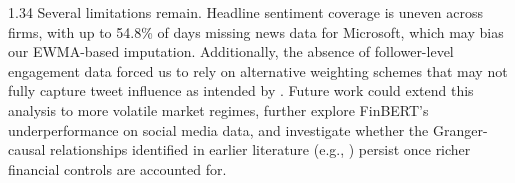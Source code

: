 \documentclass{article}
\begin{document}
\begin{setstretch}{1.34}
Several limitations remain. Headline sentiment coverage is uneven across firms, with up to 54.8\% of days missing news data for Microsoft, which may bias our EWMA-based imputation. Additionally, the absence of follower-level engagement data forced us to rely on alternative weighting schemes that may not fully capture tweet influence as intended by \textcite{shao2025revisiting}. Future work could extend this analysis to more volatile market regimes, further explore FinBERT's underperformance on social media data, and investigate whether the Granger-causal relationships identified in earlier literature (e.g., \textcite{bollen2011twitter}) persist once richer financial controls are accounted for.

\printbibliography

\end{setstretch}
\end{document}
